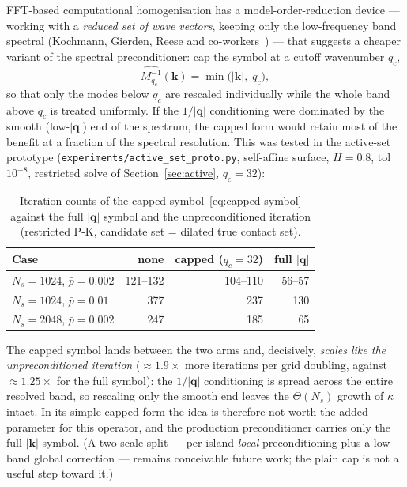 \documentclass[11pt,a4paper]{article}
\begin{document}
FFT-based computational homogenisation has a model-order-reduction device ---
working with a \emph{reduced set of wave vectors}, keeping only the
low-frequency band spectral (Kochmann, Gierden, Reese and
co-workers~\cite{GierdenEtAl2022}) --- that suggests a cheaper variant of the
spectral preconditioner: cap the symbol at a cutoff wavenumber $q_c$,
\begin{equation}
  \widehat{M^{-1}_{q_c}}(\mathbf k) = \min\bigl(|\mathbf k|,\; q_c\bigr),
  \label{eq:capped-symbol}
\end{equation}
so that only the modes below $q_c$ are rescaled individually while the whole
band above $q_c$ is treated uniformly.  If the $1/|\mathbf q|$ conditioning
were dominated by the smooth (low-$|\mathbf q|$) end of the spectrum, the
capped form would retain most of the benefit at a fraction of the spectral
resolution.  This was tested in the active-set prototype
(\texttt{experiments/active\_set\_proto.py}, self-affine surface, $H = 0.8$,
tol $10^{-8}$, restricted solve of Section~\ref{sec:active}, $q_c = 32$):

\begin{table}[ht]
\centering
\caption{Iteration counts of the capped symbol~\eqref{eq:capped-symbol}
         against the full $|\mathbf q|$ symbol and the unpreconditioned
         iteration (restricted P-K, candidate set = dilated true contact set).}
\label{tab:capped}
\begin{tabular}{@{}lrrr@{}}
\toprule
Case & none & capped ($q_c{=}32$) & full $|\mathbf q|$ \\
\midrule
$N_s{=}1024$, $\bar p = 0.002$ & 121--132 & 104--110 & 56--57 \\
$N_s{=}1024$, $\bar p = 0.01$  & 377      & 237      & 130    \\
$N_s{=}2048$, $\bar p = 0.002$ & 247      & 185      & 65     \\
\bottomrule
\end{tabular}
\end{table}

The capped symbol lands between the two arms and, decisively, \emph{scales
like the unpreconditioned iteration} ($\approx\!1.9\times$ more iterations per
grid doubling, against $\approx\!1.25\times$ for the full symbol): the
$1/|\mathbf q|$ conditioning is spread across the entire resolved band, so
rescaling only the smooth end leaves the $\Theta(N_s)$ growth of
$\kappa$ intact.  In its simple capped form the idea is therefore not worth
the added parameter for this operator, and the production preconditioner
carries only the full $|\mathbf k|$ symbol.  (A two-scale split ---
per-island \emph{local} preconditioning plus a low-band global correction ---
remains conceivable future work; the plain cap is not a useful step toward
it.)
\end{document}
